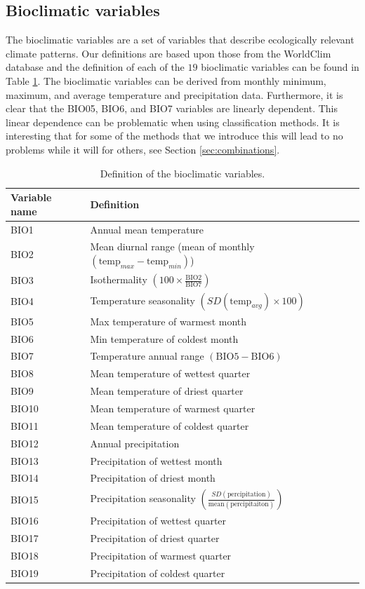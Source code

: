 \subsection{Bioclimatic variables}
The bioclimatic variables are a set of variables that describe ecologically relevant climate patterns. Our definitions are based upon those from the WorldClim database \parencite{hijmans_very_2005} and the definition of each of the $19$ bioclimatic variables can be found in Table \ref{table:Bioclim}. The bioclimatic variables can be derived from monthly minimum, maximum, and average temperature and precipitation data. Furthermore, it is clear that the BIO05, BIO6, and BIO7 variables are linearly dependent. This linear dependence can be problematic when using classification methods. It is interesting that for some of the methods that we introduce this will lead to no problems while it will for others, see Section \ref{sec:combinations}. \\ 

\begin{table}[htb]
\centering
\begin{tabular}{ll}
\toprule
Variable name & Definition \\ 
\midrule
BIO1 & Annual mean temperature \\
BIO2 & Mean diurnal range (mean of monthly $\left( \text{temp}_{max} - \text{temp}_{min} \right)$) \\
BIO3 & Isothermality $\left( 100 \times \frac{\text{BIO2}}{\text{BIO7}} \right)$  \\
BIO4 & Temperature seasonality $\left(SD(\text{temp}_{avg}) \times 100\right)$ \\
BIO5 & Max temperature of warmest month \\
BIO6 & Min temperature of coldest month \\
BIO7 & Temperature annual range $\left(\text{BIO5} - \text{BIO6}\right)$ \\
BIO8 & Mean temperature of wettest quarter \\
BIO9 & Mean temperature of driest quarter \\
BIO10 & Mean temperature of warmest quarter \\
BIO11 & Mean temperature of coldest quarter \\
BIO12 & Annual precipitation \\
BIO13 & Precipitation of wettest month \\
BIO14 & Precipitation of driest month \\
BIO15 & Precipitation seasonality $\left( \frac{SD( \text{percipitation})}{\text{mean}(\text{percipitaiton})} \right)$ \\
BIO16 & Precipitation of wettest quarter \\
BIO17 & Precipitation of driest quarter \\
BIO18 & Precipitation of warmest quarter \\
BIO19 & Precipitation of coldest quarter \\
\bottomrule
\end{tabular}
\caption{\label{table:Bioclim}Definition of the bioclimatic variables.}
\end{table}

